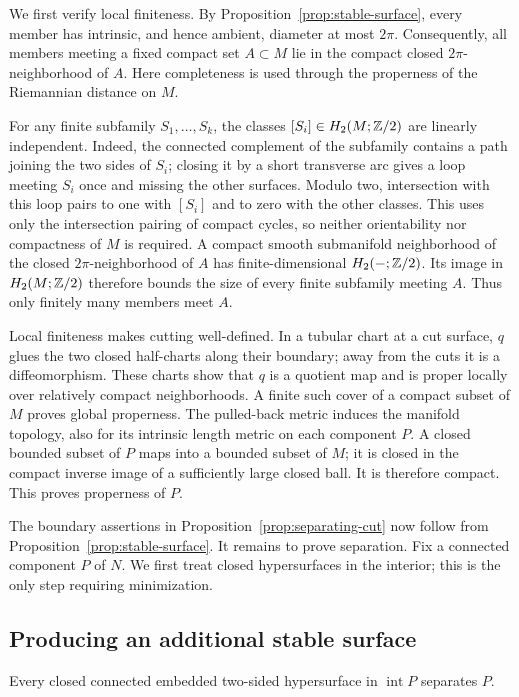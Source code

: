 We first verify local finiteness. By Proposition~\ref{prop:stable-surface},
every member has intrinsic, and hence ambient, diameter at most $2\pi$.
Consequently, all members meeting a fixed compact set $A\subset M$ lie
in the compact closed $2\pi$-neighborhood of $A$. Here completeness is
used through the properness of the Riemannian distance on $M$.

For any finite subfamily $S_1,\ldots,S_k$, the classes
$[S_i]\in H_2(M;\mathbb Z/2)$ are linearly independent. Indeed, the connected
complement of the subfamily contains a path joining the two sides of
$S_i$; closing it by a short transverse arc gives a loop meeting $S_i$
once and missing the other surfaces. Modulo two, intersection with this
loop pairs to one with $[S_i]$ and to zero with the other classes. This
uses only the intersection pairing of compact cycles, so neither
orientability nor compactness of $M$ is required. A compact smooth
submanifold neighborhood of the closed $2\pi$-neighborhood of $A$ has
finite-dimensional $H_2(-;\mathbb Z/2)$. Its image in $H_2(M;\mathbb Z/2)$ therefore
bounds the size of every finite subfamily meeting $A$. Thus only finitely
many members meet $A$.

Local finiteness makes cutting well-defined. In a tubular chart at a cut
surface, $q$ glues the two closed half-charts along their boundary; away
from the cuts it is a diffeomorphism. These charts show that $q$ is a
quotient map and is proper locally over relatively compact neighborhoods.
A finite such cover of a compact subset of $M$ proves global properness.
The pulled-back metric induces the manifold topology, also for its
intrinsic length metric on each component $P$. A closed bounded subset
of $P$ maps into a bounded subset of $M$; it is closed in the compact
inverse image of a sufficiently large closed ball. It is therefore
compact. This proves properness of $P$.

The boundary assertions in Proposition~\ref{prop:separating-cut} now
follow from Proposition~\ref{prop:stable-surface}. It remains to prove
separation. Fix a connected component $P$ of $N$. We first treat closed
hypersurfaces in the interior; this is
the only step requiring minimization.

\subsection{Producing an additional stable surface}

\begin{lemma}\label{lem:closed-separation}
Every closed connected embedded two-sided hypersurface in
$\operatorname{int}P$ separates $P$.
\end{lemma}

